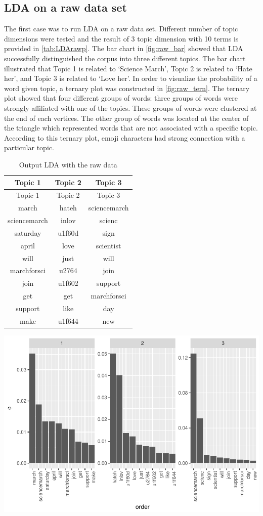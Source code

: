 \documentclass[]{article}
\begin{document}
\subsection{LDA on a raw data set}\label{lda-on-a-raw-data-set}

The first case was to run LDA on a raw data set. Different number of
topic dimensions were tested and the result of 3 topic dimension with 10
terms is provided in \autoref{tab:LDArawp}. The bar chart in
\autoref{fig:raw_bar} showed that LDA successfully distinguished the
corpus into three different topics. The bar chart illustrated that Topic
1 is related to `Science March', Topic 2 is related to `Hate her', and
Topic 3 is related to `Love her'. In order to visualize the probability
of a word given topic, a ternary plot was constructed in
\autoref{fig:raw_tern}. The ternary plot showed that four different
groups of words: three groups of words were strongly affiliated with one
of the topics. These groups of words were clustered at the end of each
vertices. The other group of words was located at the center of the
triangle which represented words that are not associated with a specific
topic. According to this ternary plot, emoji characters had strong
connection with a particular topic.

\begin{longtable}[]{@{}ccc@{}}
\caption{\label{tab:LDAraw} Output LDA with the raw data}\tabularnewline
\toprule
Topic 1 & Topic 2 & Topic 3\tabularnewline
\midrule
\endfirsthead
\toprule
Topic 1 & Topic 2 & Topic 3\tabularnewline
\midrule
\endhead
march & hateh & sciencemarch\tabularnewline
sciencemarch & inlov & scienc\tabularnewline
saturday & u1f60d & sign\tabularnewline
april & love & scientist\tabularnewline
will & just & will\tabularnewline
marchforsci & u2764 & join\tabularnewline
join & u1f602 & support\tabularnewline
get & get & marchforsci\tabularnewline
support & like & day\tabularnewline
make & u1f644 & new\tabularnewline
\bottomrule
\end{longtable}

\includegraphics{CC_paper_files/figure-latex/unnamed-chunk-4-1.pdf}
\end{document}
